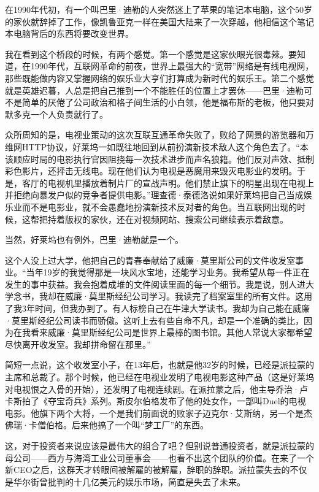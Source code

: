 在1990年代初，有一个叫巴里·迪勒的人突然迷上了苹果的笔记本电脑，这个50岁的家伙就辞掉了工作，像凯鲁亚克一样在美国大陆来了一次穿越，他相信这个笔记本电脑背后的东西将要改变世界。

我在看到这个桥段的时候，有两个感觉。第一个感觉是这家伙眼光很毒辣。要知道，在1990年代，互联网革命的前夜，世界上最强大的``宽带''网络是有线电视网，那些既能做内容又掌握网络的娱乐业大亨们打算成为新时代的娱乐王。第二个感觉就是英雄迟暮，人总是把自己推到一个不能胜任的位置上才罢休------巴里·迪勒可不是简单的厌倦了公司政治和格子间生活的小白领，他是福布斯的老板，他只要对默多克一个人负责就行了。

众所周知的是，电视业策动的这次互联互通革命失败了，败给了网景的游览器和万维网HTTP协议，好莱坞一如既往地回到从前扮演新技术敌人这个角色去了。``本该顺应时局的电影执行官因阻挠每一次技术进步而声名狼籍。他们反对声效、抵制彩色影片，还抨击无线电。现在他们认为电视是恶魔用来毁灭电影业的发明。于是，客厅的电视机里播放着制片厂的宣战声明。他们禁止旗下的明星出现在电视上并拒绝向暴发户似的竞争者提供电影。''理查德·泰德洛说如果好莱坞把自己当成娱乐业而不是电影业，就不会愚蠢地扮演新技术反对者的角色。当互联网出现的时候，这帮把持着版权的家伙，还在对视频网站、搜索公司继续表示着敌意。

当然，好莱坞也有例外，巴里·迪勒就是一个。

这个人没上过大学，他把自己的青春奉献给了威廉·莫里斯公司的文件收发室事业。``当年19岁的我觉得那是一块风水宝地，还能学习业务。我希望从每一件正在发生的事中获益。我会抱着成堆的文件阅读里面的每一个细节。我是说，别人进大学念书，我却在威廉·莫里斯经纪公司学习。我读完了档案室里的所有文件。这用了我3年时间，但我办到了。有人标榜自己在牛津大学读书。我却为自己能在威廉·莫里斯经纪公司读书而骄傲。这听上去有些自命不凡，却是一个准确的类比，因为在我看来威廉·莫里斯经纪公司是世界上最棒的图书馆。其他人常说大家都希望尽快离开收发室。我却拼命留在那里。''

简短一点说，这个收发室小子，在13年后，也就是他32岁的时候，已经是派拉蒙的主席和总裁了。那个时候，他已经在电视业发明了电视电影这种产品（这是好莱坞对电视恨之入骨的开始），还发明了电视连续剧。在派拉蒙之后，他主导乔治·卢卡斯拍了《夺宝奇兵》系列。斯皮尔伯格发布了他的处女作，一部叫Duel的电视电影。他旗下两个大将，一个是我们前面说的败家子迈克尔·艾斯纳，另一个是杰佛瑞·卡僧伯格。后来他搞了一个叫``梦工厂''的东西。

这，对于投资者来说应该是最伟大的组合了吧？但别说普通投资者，就是派拉蒙的母公司------西方与海湾工业公司董事会------也看不出这个团队的价值。在来了一个新CEO之后，这群天才转眼间被解雇的被解雇，辞职的辞职。派拉蒙失去的不仅是华尔街曾批判的十几亿美元的娱乐市场，简直是失去了未来。

